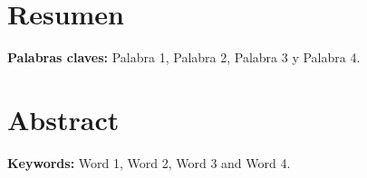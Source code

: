 \chapter*{Resumen}
    \lipsum[1-2]
    
    \textbf{Palabras claves:} Palabra 1, Palabra 2, Palabra 3 y Palabra 4.
    
\chapter*{Abstract}
    \lipsum[1-2]
    
    \textbf{Keywords:} Word 1, Word 2, Word 3 and Word 4.
    
\newpage